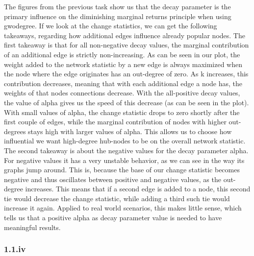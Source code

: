 \documentclass[
]{article}
\begin{document}
The figures from the previous task show us that the decay parameter is
the primary influence on the diminishing marginal returns principle when
using gwodegree. If we look at the change statistics, we can get the
following takeaways, regarding how additional edges influence already
popular nodes. The first takeaway is that for all non-negative decay
values, the marginal contribution of an additional edge is strictly
non-increasing. As can be seen in our plot, the weight added to the
network statistic by a new edge is always maximized when the node where
the edge originates has an out-degree of zero. As k increases, this
contribution decreases, meaning that with each additional edge a node
has, the weights of that nodes connections decrease. With the
all-positive decay values, the value of alpha gives us the speed of this
decrease (as can be seen in the plot). With small values of alpha, the
change statistic drops to zero shortly after the first couple of edges,
while the marginal contribution of nodes with higher out-degrees stays
high with larger values of alpha. This allows us to choose how
influential we want high-degree hub-nodes to be on the overall network
statistic. The second takeaway is about the negative values for the
decay parameter alpha. For negative values it has a very unstable
behavior, as we can see in the way its graphs jump around. This is,
because the base of our change statistic becomes negative and thus
oscillates between positive and negative values, as the out-degree
increases. This means that if a second edge is added to a node, this
second tie would decrease the change statistic, while adding a third
such tie would increase it again. Applied to real world scenarios, this
makes little sense, which tells us that a positive alpha as decay
parameter value is needed to have meaningful results.

\subsubsection{1.1.iv}\label{iv}
\end{document}
